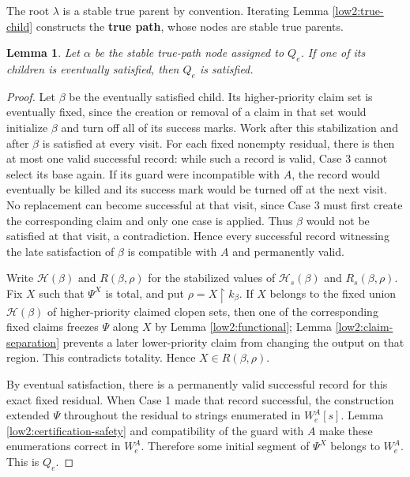 \documentclass[10pt,a4paper]{amsart}
\newtheorem{lemma}[theorem]{Lemma}
\begin{document}
The root $\lambda$ is a stable true parent by convention. Iterating Lemma
\ref{low2:true-child} constructs the \textbf{true path}, whose nodes
are stable true parents. 

\begin{lemma}\label{low2:satisfied-implies-q}
Let $\alpha$ be the stable true-path node assigned to $Q_e$. If one of its
children is eventually satisfied, then $Q_e$ is satisfied.
\end{lemma}

\begin{proof}
Let $\beta$ be the eventually satisfied child. Its higher-priority claim
set is eventually fixed, since the creation or removal of a claim in that set
would initialize $\beta$ and turn off all of its success marks. Work after
this stabilization and after $\beta$ is satisfied at every visit. For each
fixed nonempty residual, there is then at most one valid successful record:
while such a record is valid, Case 3 cannot select its base again. If its guard
were incompatible with $A$, the record would eventually be killed and its
success mark would be turned off at the next visit. No replacement can become
successful at that visit, since Case 3 must first create the corresponding
claim and only one case is applied. Thus $\beta$ would not be satisfied at
that visit, a contradiction. Hence every successful record witnessing the
late satisfaction of $\beta$ is compatible with $A$ and permanently valid.

Write $\mathcal H(\beta)$ and $R(\beta,\rho)$ for the stabilized values of
$\mathcal H_s(\beta)$ and $R_s(\beta,\rho)$. Fix $X$ such that $\Psi^X$ is
total, and put
$\rho=X\upharpoonright k_\beta$. If $X$ belongs to the fixed union
$\mathcal H(\beta)$ of higher-priority claimed clopen sets, then one of the
corresponding fixed claims freezes $\Psi$ along $X$ by Lemma
\ref{low2:functional}; Lemma \ref{low2:claim-separation} prevents a later
lower-priority claim from changing the output on that region. This
contradicts totality. Hence
$X\in R(\beta,\rho)$.

By eventual satisfaction, there is a permanently valid successful record for
this exact fixed residual. When Case 1 made that record successful,
the construction extended $\Psi$ throughout the residual to strings
enumerated in $W_e^A[s]$. Lemma \ref{low2:certification-safety} and
compatibility of the guard with $A$ make these enumerations correct in
$W_e^A$. Therefore some initial segment of $\Psi^X$ belongs to $W_e^A$. This
is $Q_e$.
\end{proof}
\end{document}
